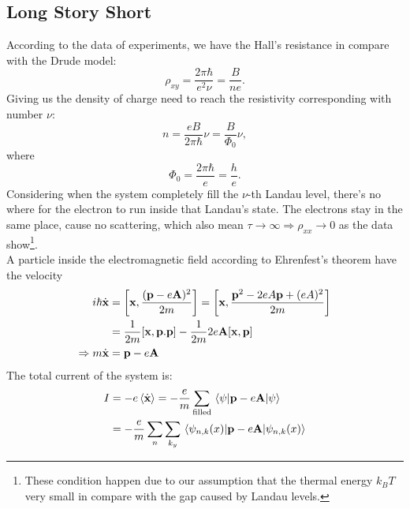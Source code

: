 \documentclass[unnumsec,webpdf,modern,large]{mam-authoring-template}%
\theoremstyle{thmstyleone}%
\theoremstyle{thmstyletwo}%
\theoremstyle{thmstylethree}%
\begin{document}
\subsection{Long Story Short}
\quad According to the data of experiments, we have the Hall's resistance in compare with the Drude model:
\begin{equation}
	\rho_{xy} = \frac{2\pi \hbar}{e^2 \nu} = \frac{B}{n e}.
\end{equation}
\quad Giving us the density of charge need to reach the resistivity corresponding with number \(\nu\):
\begin{equation}
	n = \frac{eB}{2\pi \hbar}\nu= \frac{B}{\Phi_0}\nu,
\end{equation}
where
\begin{equation}\label{def Phi_0}
	\Phi_0 =\frac{2\pi \hbar}{e}= \frac{h}{e}.
\end{equation}
\quad Considering when the system completely fill the \(\nu\)-th Landau level, there's no where for the electron to run inside that Landau's state. The electrons stay in the same place, cause no scattering, which also mean \(\tau \to \infty \Rightarrow \rho_{xx} \to 0\) as the data show\footnote{These condition happen due to our assumption that the thermal energy \(k_B T\) very small in compare with the gap caused by Landau levels.}.\\\null
\quad A particle inside the electromagnetic field according to Ehrenfest's theorem have the velocity
\begin{align}
	i\hbar\dot{\textbf{x}} &= \comm{\textbf{x}}{\frac{(\textbf{p}-e\textbf{A})^2}{2m}} = \comm{\textbf{x}}{\frac{\textbf{p}^2 -2 eA\textbf{p}+(eA)^2}{2m}}\nonumber\\
	&= \frac{1}{2m}\comm{\textbf{x}}{\textbf{p}.\textbf{p}} -  \frac{1}{2m} 2e\textbf{A} \comm{\textbf{x}}{\textbf{p}}\nonumber\\
	\Rightarrow m\dot{\textbf{x}}&= \textbf{p} -e\textbf{A}
\end{align}
The total current of the system is:
\begin{align}
	I &= -e\ev{\dot{\textbf{x}}} = -\frac{e}{m} \sum_{\text{filled}} \ev*{\textbf{p} -e\textbf{A}}{\psi}\\
	&= -\frac{e}{m} \sum_{n} \sum_{k_y}  \ev*{\textbf{p} -e\textbf{A}}{\psi_{n,k}(x)}
\end{align}
\end{document}
